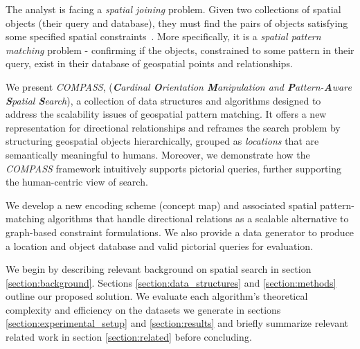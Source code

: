 \par{
     The analyst is facing a \textit{spatial joining} problem. Given two collections of spatial objects (their query and database), they must find the pairs of objects satisfying some specified spatial constraints~\cite{Jacox2007}. 
    More specifically, it is a \textit{spatial pattern matching} problem - confirming if the objects, constrained to some pattern in their query, exist in their database of geospatial points and relationships.
}
\par{
    We present \emph{COMPASS}, (\textit{\textbf{C}ardinal \textbf{O}rientation \textbf{M}anipulation and \textbf{P}attern-\textbf{A}ware \textbf{S}patial \textbf{S}earch}), a collection of data structures and algorithms designed to address the scalability issues of geospatial pattern matching. It offers a new representation for directional relationships and reframes the search problem by structuring geospatial objects hierarchically, grouped as \textit{locations} that are semantically meaningful to humans.
    Moreover, we demonstrate how the \emph{COMPASS} framework intuitively supports pictorial queries, further supporting the human-centric view of search.   

    We develop a new encoding scheme (concept map) and associated spatial pattern-matching algorithms that handle directional relations as a scalable alternative to graph-based constraint formulations.
    We also provide a data generator to produce a location and object database and valid pictorial queries for evaluation.
 
    We begin by describing relevant background on spatial search in section \ref{section:background}. Sections \ref{section:data_structures} and \ref{section:methods} outline our proposed solution. We evaluate each algorithm's theoretical complexity and efficiency on the datasets we generate in sections \ref{section:experimental_setup} and \ref{section:results} and briefly summarize relevant related work in section \ref{section:related} before concluding.
}


